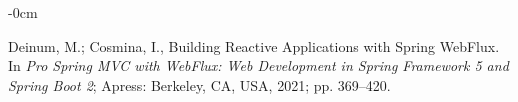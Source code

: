 \documentclass[software,article,accept,pdftex,moreauthors]{Definitions/mdpi}
\begin{document}
\begin{adjustwidth}{-\extralength}{0cm}
\begin{thebibliography}{999}
Deinum, M.; Cosmina, I., Building Reactive Applications with Spring WebFlux.
\newblock In {\em Pro Spring MVC with WebFlux: Web Development in Spring
  Framework 5 and Spring Boot 2}; Apress: Berkeley, CA, USA, 2021; pp. 369--420.

\end{thebibliography}



	\PublishersNote{}
\end{adjustwidth}
\end{document}
